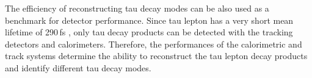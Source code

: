 The efficiency of reconstructing tau decay modes can be also used as a benchmark for detector performance. Since tau lepton has a very short mean lifetime of 290\,fs \cite{Abreu:1991jn}, only tau decay products can be detected with the tracking detectors and calorimeters. Therefore, the performances of the calorimetric and track systems determine the ability to reconstruct the tau lepton decay products and identify different tau decay modes.

